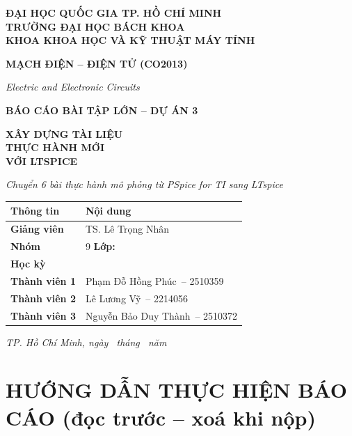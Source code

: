 \documentclass[12pt,a4paper]{article}
\newif\ifguide
\newcommand{\NhomSo}{9}                          %
\newcommand{\LopHoc}{\dotuline}                  %
\newcommand{\HocKy}{\dotuline}                   %
\newcommand{\TVa}{Phạm Đỗ Hồng Phúc}   \newcommand{\MSa}{2510359}   \newcommand{\PTa}{-- Lab 5, Lab 6}  %
\newcommand{\TVb}{Lê Lương Vỹ}          \newcommand{\MSb}{2214056}   \newcommand{\PTb}{-- Lab 1, Lab 2}  %
\newcommand{\TVc}{Nguyễn Bảo Duy Thành} \newcommand{\MSc}{2510372}   \newcommand{\PTc}{-- Lab 3, Lab 4}  %
\newcommand{\dotuline}{\makebox[2.6cm]{\dotfill}}
\newcommand{\hc}[1]{\cellcolor{navy}\color{white}\sffamily\bfseries\small #1}
\begin{document}
\begin{titlepage}
\centering
{\sffamily\bfseries\large ĐẠI HỌC QUỐC GIA TP. HỒ CHÍ MINH\\
TRƯỜNG ĐẠI HỌC BÁCH KHOA\\
KHOA KHOA HỌC VÀ KỸ THUẬT MÁY TÍNH\par}
\vspace{1.6cm}
{\sffamily\bfseries\Large\color{navy} MẠCH ĐIỆN -- ĐIỆN TỬ (CO2013)\par}
{\itshape\color{navy} Electric and Electronic Circuits\par}
\vspace{1.8cm}
{\sffamily\bfseries\LARGE\color{accent} BÁO CÁO BÀI TẬP LỚN -- DỰ ÁN 3\par}
\vspace{4pt}
{\sffamily\bfseries\Huge\color{navy} XÂY DỰNG TÀI LIỆU\\[3pt] THỰC HÀNH MỚI\\[3pt] VỚI LTSPICE\par}
\vspace{6pt}
{\itshape\large Chuyển 6 bài thực hành mô phỏng từ PSpice for TI sang LTspice\par}
\vspace{1.6cm}
\renewcommand{\arraystretch}{1.5}
\begin{tabular}{|>{\bfseries\sffamily\small}p{4.4cm}|p{9.4cm}|}
\hline
\hc{Thông tin} & \hc{Nội dung}\\ \hline
Giảng viên & TS. Lê Trọng Nhân\\ \hline
Nhóm & \NhomSo \hspace{1.2cm} \textbf{Lớp:} \LopHoc\\ \hline
Học kỳ & \HocKy\\ \hline
Thành viên 1 & \TVa\ -- \MSa\\ \hline
Thành viên 2 & \TVb\ -- \MSb\\ \hline
Thành viên 3 & \TVc\ -- \MSc\\ \hline
\end{tabular}
\vfill
{\itshape TP. Hồ Chí Minh, ngày \dotuline\ tháng \dotuline\ năm \dotuline\par}
\end{titlepage}

\tableofcontents
\clearpage

\ifguide
\section*{HƯỚNG DẪN THỰC HIỆN BÁO CÁO (đọc trước -- xoá khi nộp)}
\end{document}
